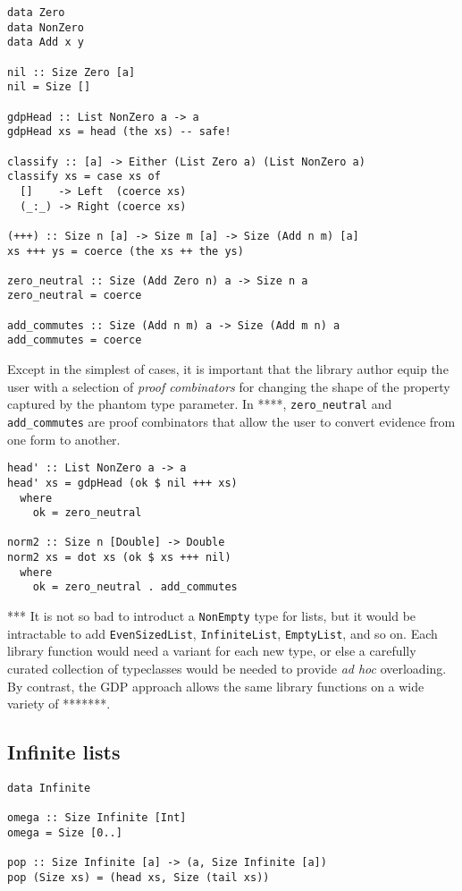 \documentclass[format=sigplan, review=false, screen=true]{acmart}
\begin{document}
\begin{verbatim}
data Zero
data NonZero
data Add x y

nil :: Size Zero [a]
nil = Size []

gdpHead :: List NonZero a -> a
gdpHead xs = head (the xs) -- safe!

classify :: [a] -> Either (List Zero a) (List NonZero a)
classify xs = case xs of
  []    -> Left  (coerce xs)
  (_:_) -> Right (coerce xs)
  
(+++) :: Size n [a] -> Size m [a] -> Size (Add n m) [a]
xs +++ ys = coerce (the xs ++ the ys)

zero_neutral :: Size (Add Zero n) a -> Size n a
zero_neutral = coerce

add_commutes :: Size (Add n m) a -> Size (Add m n) a
add_commutes = coerce
\end{verbatim}

Except in the simplest of cases, it is important that the library author equip the
user with a selection of \emph{proof combinators} for changing the shape of the
property captured by the phantom type parameter. In ****, \texttt{zero\_neutral}
and \texttt{add\_commutes} are proof combinators that allow the user to convert
evidence from one form to another.

\begin{verbatim}
head' :: List NonZero a -> a
head' xs = gdpHead (ok $ nil +++ xs)
  where
    ok = zero_neutral

norm2 :: Size n [Double] -> Double
norm2 xs = dot xs (ok $ xs +++ nil)
  where
    ok = zero_neutral . add_commutes
\end{verbatim}

*** It is not so bad to introduct a \texttt{NonEmpty} type for lists, but it
would be intractable to add \texttt{EvenSizedList}, \texttt{InfiniteList},
\texttt{EmptyList}, and so on. Each library function would need a variant
for each new type, or else a carefully curated collection of typeclasses would
be needed to provide \emph{ad hoc} overloading. By contrast, the GDP approach
allows the same library functions on a wide variety of *******.

\subsection{Infinite lists}

\begin{verbatim}
data Infinite

omega :: Size Infinite [Int]
omega = Size [0..]

pop :: Size Infinite [a] -> (a, Size Infinite [a])
pop (Size xs) = (head xs, Size (tail xs))
\end{verbatim}
\end{document}
